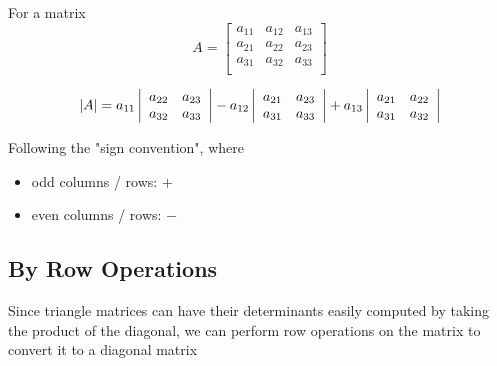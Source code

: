 \begin{framed}
   For a matrix \[
     A = \begin{bmatrix} 
        a_{11} & a_{12} & a_{13} \\
        a_{21} & a_{22} & a_{23} \\
        a_{31} & a_{32} & a_{33} \\
     \end{bmatrix}
   \] 

   \[
      \left| A \right|  = a_{11} 
      \left| 
         \begin{array}{c c c}
            a_{22} & a_{23} \\
            a_{32} & a_{33}
         \end{array}
      \right|  - a_{12}
      \left| 
         \begin{array}{c c c}
            a_{21} & a_{23} \\
            a_{31} & a_{33}
         \end{array}
      \right|  + a_{13}
      \left| 
         \begin{array}{c c c}
            a_{21} & a_{22} \\
            a_{31} & a_{32}
         \end{array}
      \right| 
   \] 

   Following the "sign convention", where \begin{itemize}
      \item odd columns / rows: $+$
      \item even columns / rows: $-$
   \end{itemize}
\end{framed}


\subsection{By Row Operations}

\begin{framed}
   Since triangle matrices can have their determinants easily computed by taking the product of the diagonal, we can perform row operations on the matrix to convert it to a diagonal matrix 
\end{framed}

